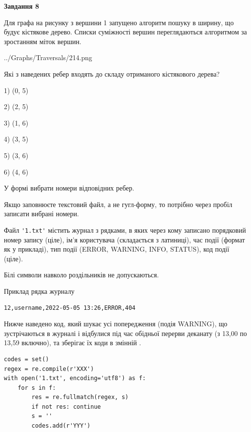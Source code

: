 \documentclass[12pt, ukrainian]{article}
\def\code#1{\Verb!#1!}
\begin{document}
{\begin {large}
{\begin {center}\textbf{Завдання 8}\end {center}}\par
Для графа на рисунку з вершини 1 запущено алгоритм пошуку в ширину, що будує кістякове дерево. Списки суміжності вершин переглядаються алгоритмом за зростанням міток вершин.\par
\begin{center}
	{../Graphs/Traversals/214.png}
\end{center}
\par Які з наведених ребер входять до складу отриманого кістякового дерева?\par
1) (0, 5)\par
2) (2, 5)\par
3) (1, 6)\par
4) (3, 5)\par
5) (3, 6)\par
6) (4, 6)\par
{\vskip 15pt} У формі вибрати номери відповідних ребер.


Якщо заповнюєте текстовий файл, а не гугл-форму, то потрібно через пробіл записа\-ти вибрані номери.\par
\newpage


Файл \code{'1.txt'} містить журнал з рядками, в яких через кому записано поряд\-ко\-вий номер запису (ціле), ім'я користувача (складається з латиниці), час події (фор\-мат як у прикладі), тип події (ERROR, WARNING, INFO, STATUS), код події (ціле).

Білі символи навколо роздільників не допускаються.

Приклад рядка журналу



\begin{verbatim}
12,username,2022-05-05 13:26,ERROR,404
\end{verbatim}


Нижче наведено код, який шукає усі попередження (подія WARNING), що зустрі\-ча\-ються в журналі і відбулися під час обідньої перерви деканату (з 13,00 по 13,59 включно), та зберігає їх коди в змінній .



\begin{verbatim}
codes = set()
regex = re.compile(r'XXX')
with open('1.txt', encoding='utf8') as f:
    for s in f:
        res = re.fullmatch(regex, s)
        if not res: continue
        s = ''
        codes.add(r'YYY')
\end{verbatim}





\end{large}}
\end{document}
